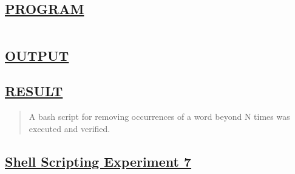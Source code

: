 \documentclass[a4paper, 12pt]{article}
\begin{document}
\subsection*{\underline{PROGRAM}}
\begin{quote}
\inputminted[fontsize=\small,breaklines,breakanywhere]{sh}{shell1.sh}%
\end{quote}


\subsection*{\underline{OUTPUT}}

\begin{figure}[H] 
    \centering
\end{figure}


\subsection*{\underline{RESULT}}
\begin{quote}
A bash script for removing occurrences of a word beyond N times was executed and verified.
\end{quote}

\newpage
\begin{center}
\section*{\LARGE \textbf{\underline{Shell Scripting Experiment 7}}} %
\end{center}
\end{document}
